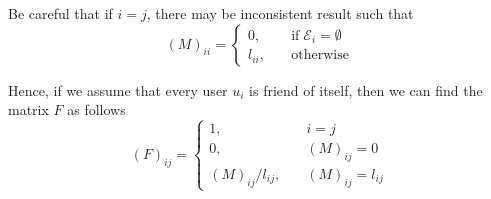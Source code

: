 \documentclass[twoside]{article}
\theoremstyle{definition}
\theoremstyle{remark}
\begin{document}
Be careful that if $i = j$, there may be inconsistent result such that
\begin{equation}
  {(M)}_{ii} = \left\{
  \begin{array}{ll}
    0, \quad & \textrm{if}\; {\mathcal{E}_i} = \emptyset \\
    l_{ii}, \quad & \textrm{otherwise}
  \end{array}
  \right.
\end{equation}

Hence, if we assume that every user $u_i$ is friend of itself, then we can
find the matrix $F$ as follows
\begin{equation}
  {(F)}_{ij} = \left\{
  \begin{array}{ll}
    1, \quad & i = j \\
    0, \quad & {(M)}_{ij} = 0 \\
    {(M)}_{ij}/l_{ij}, \quad & {(M)}_{ij} = l_{ij}
  \end{array}
  \right.
\end{equation}

\printbibliography

\end{document}
